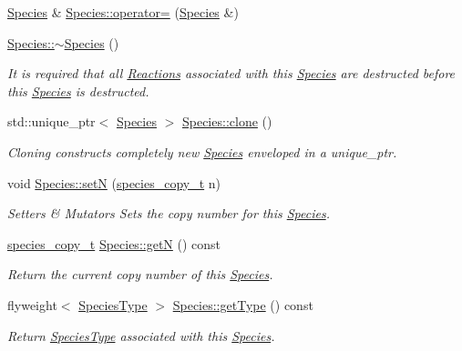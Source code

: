 \begin{DoxyCompactItemize}
\hyperlink{classSpecies}{Species} \& \hyperlink{group__Chemistry_ga0062677c88109f86560f27809fc7b37f}{Species\-::operator=} (\hyperlink{classSpecies}{Species} \&)
\item 
\hyperlink{group__Chemistry_gaf36f93648e2dedc2f05b6fb0c067f35e}{Species\-::$\sim$\-Species} ()
\begin{DoxyCompactList}\small\item\em It is required that all \hyperlink{classReaction}{Reactions} associated with this \hyperlink{classSpecies}{Species} are destructed before this \hyperlink{classSpecies}{Species} is destructed. \end{DoxyCompactList}\item 
std\-::unique\-\_\-ptr$<$ \hyperlink{classSpecies}{Species} $>$ \hyperlink{group__Chemistry_ga0a73815a85af18ccd2235a53789bc77c}{Species\-::clone} ()
\begin{DoxyCompactList}\small\item\em Cloning constructs completely new \hyperlink{classSpecies}{Species} enveloped in a unique\-\_\-ptr. \end{DoxyCompactList}\item 
void \hyperlink{group__Chemistry_ga88de7cf5130cb9cee2da3585374db654}{Species\-::set\-N} (\hyperlink{common_8h_a3503f321fd36304ee274141275cca586}{species\-\_\-copy\-\_\-t} n)
\begin{DoxyCompactList}\small\item\em Setters \& Mutators Sets the copy number for this \hyperlink{classSpecies}{Species}. \end{DoxyCompactList}\item 
\hyperlink{common_8h_a3503f321fd36304ee274141275cca586}{species\-\_\-copy\-\_\-t} \hyperlink{group__Chemistry_gaea7327b3fed261c705b4d32b9973aa58}{Species\-::get\-N} () const 
\begin{DoxyCompactList}\small\item\em Return the current copy number of this \hyperlink{classSpecies}{Species}. \end{DoxyCompactList}\item 
flyweight$<$ \hyperlink{classSpeciesType}{Species\-Type} $>$ \hyperlink{group__Chemistry_gab4d28cd0fed02b921070000b522cdd70}{Species\-::get\-Type} () const 
\begin{DoxyCompactList}\small\item\em Return \hyperlink{classSpeciesType}{Species\-Type} associated with this \hyperlink{classSpecies}{Species}. \end{DoxyCompactList}\item 

\end{DoxyCompactItemize}
